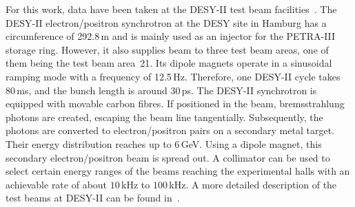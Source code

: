 
For this work, data have been taken at the {DESY-II} test beam facilities~\cite{DESYtb}. 
The DESY-II electron/positron synchrotron at the DESY site in Hamburg has a circumference of 292.8\,m and is mainly used as an injector for the PETRA-III storage ring. 
However, it also supplies beam to three test beam areas, one  of them being the test beam area~21.
Its dipole magnets operate in a sinusoidal ramping mode with a frequency of 12.5\,Hz. 
Therefore, one DESY-II cycle takes 80\,ms, and the bunch length is around 30\,ps. 
The DESY-II synchrotron is equipped with movable carbon fibres. 
If positioned in the beam, bremsstrahlung photons are created, escaping the beam line tangentially.
Subsequently, the photons are converted to electron/positron pairs on a secondary metal target. 
Their energy distribution reaches up to 6\,GeV. 
Using a dipole magnet, this secondary electron/positron beam is spread out.
A collimator can be used to select certain energy ranges of the beams reaching the experimental halls with an achievable rate of about $10$\,kHz to $100$\,kHz. 
A more detailed description of the test beams at {DESY-II} can be found in~\cite{EUDET-2007-11}.



